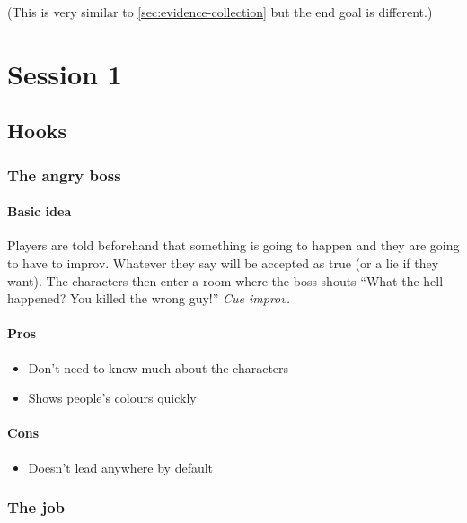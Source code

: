 (This is very similar to \ref{sec:evidence-collection} but the end goal is
different.)

\section{Session 1}

\subsection{Hooks}
\label{sec:hooks}

\subsubsection{The angry boss}
\label{sec:angry-boss}

\paragraph{Basic idea}

Players are told beforehand that something is going to happen and they are going
to have to improv. Whatever they say will be accepted as true (or a lie if they
want). The characters then enter a room where the boss shouts ``What the hell
happened? You killed the wrong guy!'' \emph{Cue improv.}

\paragraph{Pros}

\begin{itemize}
\item Don't need to know much about the characters
\item Shows people's colours quickly
\end{itemize}

\paragraph{Cons}

\begin{itemize}
\item Doesn't lead anywhere by default
\end{itemize}


\subsubsection{The job}
\label{sec:job}

